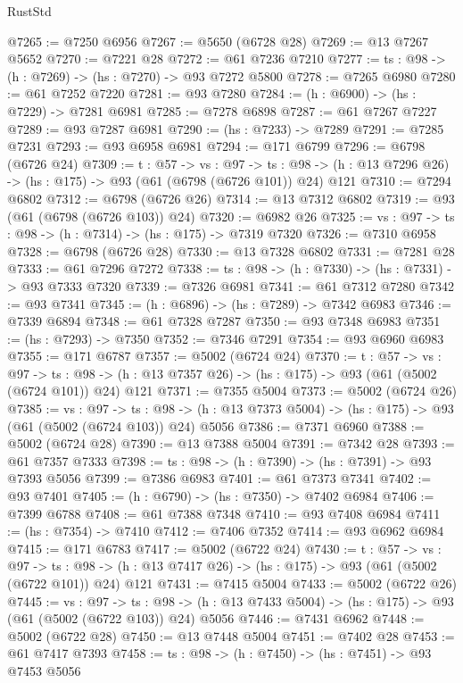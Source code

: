\begin{lexlean}{RustStd}
\begin{coremodule}
@7265 := @7250 @6956
@7267 := @5650 (@6728 @28)
@7269 := @13 @7267 @5652
@7270 := @7221 @28
@7272 := @61 @7236 @7210
@7277 := {ts : @98} -> (h : @7269) -> (hs : @7270) -> @93 @7272 @5800
@7278 := @7265 @6980
@7280 := @61 @7252 @7220
@7281 := @93 @7280
@7284 := (h : @6900) -> (hs : @7229) -> @7281 @6981
@7285 := @7278 @6898
@7287 := @61 @7267 @7227
@7289 := @93 @7287 @6981
@7290 := (hs : @7233) -> @7289
@7291 := @7285 @7231
@7293 := @93 @6958 @6981
@7294 := @171 @6799
@7296 := @6798 (@6726 @24)
@7309 := {t : @57} ->
  {vs : @97} ->
  {ts : @98} -> (h : @13 @7296 @26) -> (hs : @175) -> @93 (@61 (@6798 (@6726 @101)) @24) @121
@7310 := @7294 @6802
@7312 := @6798 (@6726 @26)
@7314 := @13 @7312 @6802
@7319 := @93 (@61 (@6798 (@6726 @103)) @24)
@7320 := @6982 @26
@7325 := {vs : @97} -> {ts : @98} -> (h : @7314) -> (hs : @175) -> @7319 @7320
@7326 := @7310 @6958
@7328 := @6798 (@6726 @28)
@7330 := @13 @7328 @6802
@7331 := @7281 @28
@7333 := @61 @7296 @7272
@7338 := {ts : @98} -> (h : @7330) -> (hs : @7331) -> @93 @7333 @7320
@7339 := @7326 @6981
@7341 := @61 @7312 @7280
@7342 := @93 @7341
@7345 := (h : @6896) -> (hs : @7289) -> @7342 @6983
@7346 := @7339 @6894
@7348 := @61 @7328 @7287
@7350 := @93 @7348 @6983
@7351 := (hs : @7293) -> @7350
@7352 := @7346 @7291
@7354 := @93 @6960 @6983
@7355 := @171 @6787
@7357 := @5002 (@6724 @24)
@7370 := {t : @57} ->
  {vs : @97} ->
  {ts : @98} -> (h : @13 @7357 @26) -> (hs : @175) -> @93 (@61 (@5002 (@6724 @101)) @24) @121
@7371 := @7355 @5004
@7373 := @5002 (@6724 @26)
@7385 := {vs : @97} ->
  {ts : @98} -> (h : @13 @7373 @5004) -> (hs : @175) -> @93 (@61 (@5002 (@6724 @103)) @24) @5056
@7386 := @7371 @6960
@7388 := @5002 (@6724 @28)
@7390 := @13 @7388 @5004
@7391 := @7342 @28
@7393 := @61 @7357 @7333
@7398 := {ts : @98} -> (h : @7390) -> (hs : @7391) -> @93 @7393 @5056
@7399 := @7386 @6983
@7401 := @61 @7373 @7341
@7402 := @93 @7401
@7405 := (h : @6790) -> (hs : @7350) -> @7402 @6984
@7406 := @7399 @6788
@7408 := @61 @7388 @7348
@7410 := @93 @7408 @6984
@7411 := (hs : @7354) -> @7410
@7412 := @7406 @7352
@7414 := @93 @6962 @6984
@7415 := @171 @6783
@7417 := @5002 (@6722 @24)
@7430 := {t : @57} ->
  {vs : @97} ->
  {ts : @98} -> (h : @13 @7417 @26) -> (hs : @175) -> @93 (@61 (@5002 (@6722 @101)) @24) @121
@7431 := @7415 @5004
@7433 := @5002 (@6722 @26)
@7445 := {vs : @97} ->
  {ts : @98} -> (h : @13 @7433 @5004) -> (hs : @175) -> @93 (@61 (@5002 (@6722 @103)) @24) @5056
@7446 := @7431 @6962
@7448 := @5002 (@6722 @28)
@7450 := @13 @7448 @5004
@7451 := @7402 @28
@7453 := @61 @7417 @7393
@7458 := {ts : @98} -> (h : @7450) -> (hs : @7451) -> @93 @7453 @5056

\end{coremodule}
\end{lexlean}
